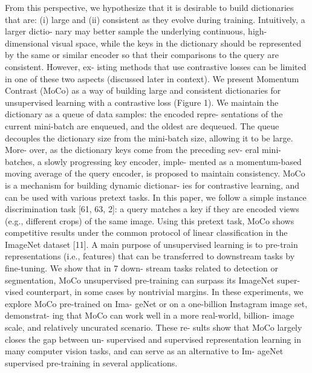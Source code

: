 \documentclass[10pt,twocolumn]{article}  %
\begin{document}
From this perspective, we hypothesize that it is desirable
to build dictionaries that are: (i) large and (ii) consistent
as they evolve during training. Intuitively, a larger dictio-
nary may better sample the underlying continuous, high-
dimensional visual space, while the keys in the dictionary
should be represented by the same or similar encoder so that
their comparisons to the query are consistent. However, ex-
isting methods that use contrastive losses can be limited in
one of these two aspects (discussed later in context).
We present Momentum Contrast (MoCo) as a way of
building large and consistent dictionaries for unsupervised
learning with a contrastive loss (Figure 1). We maintain the
dictionary as a queue of data samples: the encoded repre-
sentations of the current mini-batch are enqueued, and the
oldest are dequeued. The queue decouples the dictionary
size from the mini-batch size, allowing it to be large. More-
over, as the dictionary keys come from the preceding sev-
eral mini-batches, a slowly progressing key encoder, imple-
mented as a momentum-based moving average of the query
encoder, is proposed to maintain consistency.
MoCo is a mechanism for building dynamic dictionar-
ies for contrastive learning, and can be used with various
pretext tasks. In this paper, we follow a simple instance
discrimination task [61, 63, 2]: a query matches a key if
they are encoded views (e.g., different crops) of the same
image. Using this pretext task, MoCo shows competitive
results under the common protocol of linear classiﬁcation
in the ImageNet dataset [11].
A main purpose of unsupervised learning is to pre-train
representations (i.e., features) that can be transferred to
downstream tasks by ﬁne-tuning. We show that in 7 down-
stream tasks related to detection or segmentation, MoCo
unsupervised pre-training can surpass its ImageNet super-
vised counterpart, in some cases by nontrivial margins. In
these experiments, we explore MoCo pre-trained on Ima-
geNet or on a one-billion Instagram image set, demonstrat-
ing that MoCo can work well in a more real-world, billion-
image scale, and relatively uncurated scenario. These re-
sults show that MoCo largely closes the gap between un-
supervised and supervised representation learning in many
computer vision tasks, and can serve as an alternative to Im-
ageNet supervised pre-training in several applications.
\end{document}
